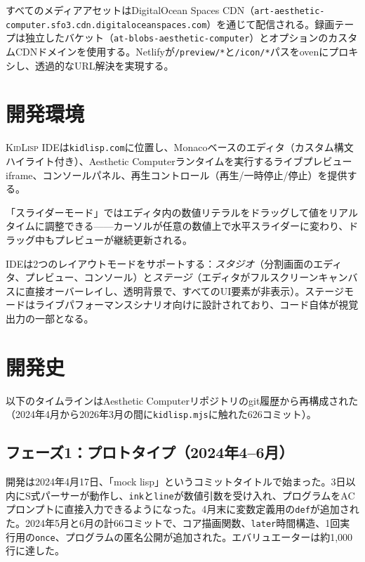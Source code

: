 \documentclass[10pt,letterpaper,twocolumn]{article}
\newcommand{\kidlisp}{\textsc{KidLisp}}
\begin{document}
すべてのメディアアセットはDigitalOcean Spaces CDN（\texttt{art-aesthetic-computer.sfo3.cdn.\allowbreak digitaloceanspaces.com}）を通じて配信される。録画テープは独立したバケット（\texttt{at-blobs-aesthetic-computer}）とオプションのカスタムCDNドメインを使用する。Netlifyが\texttt{/preview/*}と\texttt{/icon/*}パスをovenにプロキシし、透過的なURL解決を実現する。

\section{開発環境}

\kidlisp{} IDEは\texttt{kidlisp.com}に位置し、Monacoベースのエディタ（カスタム構文ハイライト付き）、Aesthetic Computerランタイムを実行するライブプレビューiframe、コンソールパネル、再生コントロール（再生/一時停止/停止）を提供する。

「スライダーモード」ではエディタ内の数値リテラルをドラッグして値をリアルタイムに調整できる——カーソルが任意の数値上で水平スライダーに変わり、ドラッグ中もプレビューが継続更新される。

IDEは2つのレイアウトモードをサポートする：\emph{スタジオ}（分割画面のエディタ、プレビュー、コンソール）と\emph{ステージ}（エディタがフルスクリーンキャンバスに直接オーバーレイし、透明背景で、すべてのUI要素が非表示）。ステージモードはライブパフォーマンスシナリオ向けに設計されており、コード自体が視覚出力の一部となる。

\section{開発史}
\label{sec:history}

以下のタイムラインはAesthetic Computerリポジトリのgit履歴から再構成された（2024年4月から2026年3月の間に\texttt{kidlisp.mjs}に触れた626コミット）。

\subsection{フェーズ1：プロトタイプ（2024年4--6月）}

開発は2024年4月17日、「mock lisp」というコミットタイトルで始まった。3日以内にS式パーサーが動作し、\texttt{ink}と\texttt{line}が数値引数を受け入れ、プログラムをACプロンプトに直接入力できるようになった。4月末に変数定義用の\texttt{def}が追加された。2024年5月と6月の計66コミットで、コア描画関数、\texttt{later}時間構造、1回実行用の\texttt{once}、プログラムの匿名公開が追加された。エバリュエーターは約1,000行に達した。
\end{document}
